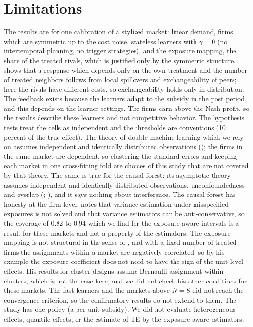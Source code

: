 \documentclass[11pt]{article}
\begin{document}
\section{Limitations}
The results are for one calibration of a stylized market: linear demand, firms which are symmetric up to the cost noise, stateless learners with $\gamma=0$ (no intertemporal planning, no trigger strategies), and the exposure mapping, the share of the treated rivals, which is justified only by the symmetric structure. \citet{leung2020} shows that a response which depends only on the own treatment and the number of treated neighbors follows from local spillovers and exchangeability of peers; here the rivals have different costs, so exchangeability holds only in distribution. The feedback exists because the learners adapt to the subsidy in the post period, and this depends on the learner settings. The firms earn above the Nash profit, so the results describe these learners and not competitive behavior. The hypothesis tests treat the cells as independent and the thresholds are conventions (10 percent of the true effect). The theory of double machine learning which we rely on assumes independent and identically distributed observations (\citealp[Section 3.1]{chernozhukov2018}); the firms in the same market are dependent, so clustering the standard errors and keeping each market in one cross-fitting fold are choices of this study that are not covered by that theory. The same is true for the causal forest: its asymptotic theory assumes independent and identically distributed observations, unconfoundedness and overlap (\citealp[Section 2.1 and Theorem 11]{wager2018}; \citealp[Section 2.1]{athey2019}), and it says nothing about interference. The causal forest has honesty at the firm level. \citet{savje2024} notes that variance estimation under misspecified exposures is not solved and that variance estimators can be anti-conservative, so the coverage of 0.82 to 0.94 which we find for the exposure-aware intervals is a result for these markets and not a property of the estimators. The exposure mapping is not structural in the sense of \citet{leung2026}, and with a fixed number of treated firms the assignments within a market are negatively correlated, so by his example the exposure coefficient does not need to have the sign of the unit-level effects. His results for cluster designs assume Bernoulli assignment within clusters, which is not the case here, and we did not check his other conditions for these markets. The fast learners and the markets above $N=8$ did not reach the convergence criterion, so the confirmatory results do not extend to them. The study has one policy (a per-unit subsidy). We did not evaluate heterogeneous effects, quantile effects, or the estimate of TE by the exposure-aware estimators.
\end{document}
